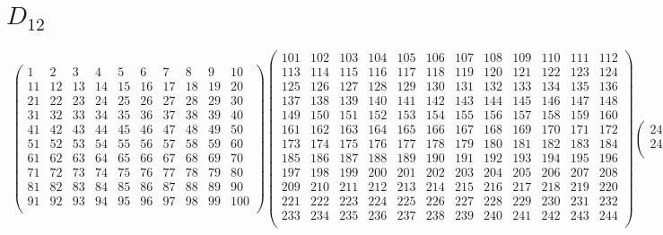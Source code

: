 \documentclass[12pt,a4paper]{amsart}
\begin{document}
\section*{$D_{12}$}
\begin{align*}
\left(\begin{array}{r|r|r|r|r|r|r|r|r|r}%
1&2&3&4&5&6&7&8&9&10\\%
\hline
11&12&13&14&15&16&17&18&19&20\\%
\hline
21&22&23&24&25&26&27&28&29&30\\%
\hline
31&32&33&34&35&36&37&38&39&40\\%
\hline
41&42&43&44&45&46&47&48&49&50\\%
\hline
51&52&53&54&55&56&57&58&59&60\\%
\hline
61&62&63&64&65&66&67&68&69&70\\%
\hline
71&72&73&74&75&76&77&78&79&80\\%
\hline
81&82&83&84&85&86&87&88&89&90\\%
\hline
91&92&93&94&95&96&97&98&99&100\\%
\end{array}\right)%
\left(\begin{array}{r|r|r|r|r|r|r|r|r|r|r|r}%
101&102&103&104&105&106&107&108&109&110&111&112\\%
\hline
113&114&115&116&117&118&119&120&121&122&123&124\\%
\hline
125&126&127&128&129&130&131&132&133&134&135&136\\%
\hline
137&138&139&140&141&142&143&144&145&146&147&148\\%
\hline
149&150&151&152&153&154&155&156&157&158&159&160\\%
\hline
161&162&163&164&165&166&167&168&169&170&171&172\\%
\hline
173&174&175&176&177&178&179&180&181&182&183&184\\%
\hline
185&186&187&188&189&190&191&192&193&194&195&196\\%
\hline
197&198&199&200&201&202&203&204&205&206&207&208\\%
\hline
209&210&211&212&213&214&215&216&217&218&219&220\\%
\hline
221&222&223&224&225&226&227&228&229&230&231&232\\%
\hline
233&234&235&236&237&238&239&240&241&242&243&244\\%
\end{array}\right)%
\left(\begin{array}{r|r}%
245&246\\%
\hline
247&248\\%
\end{array}\right)%
\end{align*}
\end{document}
